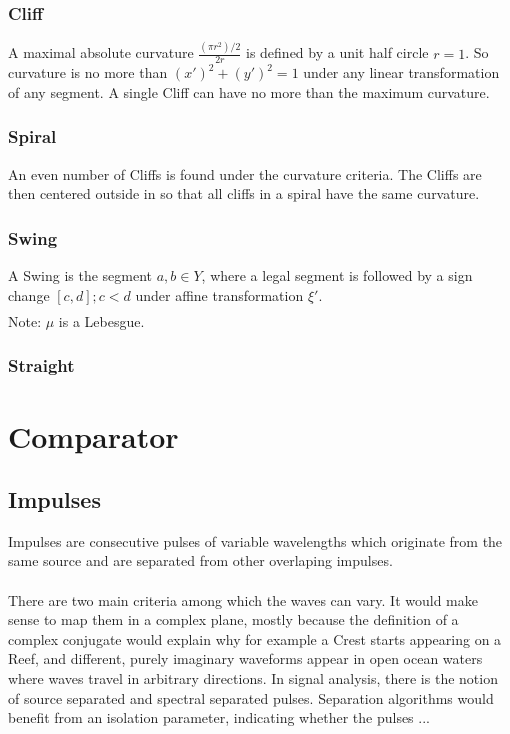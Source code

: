\documentclass{article}
\begin{document}
\subsubsection{Cliff}
A maximal absolute curvature $\frac{(\pi r^2) /2}{2r}$ is defined by a unit half circle $r=1$. So curvature is no more than $(x')^2 + (y')^2 =1$  under any linear transformation of any segment.
A single Cliff can have no more than the maximum curvature.

\subsubsection{Spiral}
An even number of Cliffs is found under the curvature criteria.
The Cliffs are then centered outside in so that all cliffs in a spiral have the same curvature.

\subsubsection{Swing}
A Swing is the segment $a,b \in Y$, where a legal segment is followed by a sign change $[c,d]; c<d$ under affine transformation $\xi'$.
\begin{align}
\end{align}
Note: $\mu$ is a Lebesgue.

\subsubsection{Straight}

\section{Comparator}
\subsection{Impulses}
Impulses are consecutive pulses of variable wavelengths which originate from the same source and are separated from other overlaping impulses.\\\\
There are two main criteria among which the waves can vary. It would make sense to map them in a complex plane, mostly because the definition of a complex conjugate would explain why for example a Crest starts appearing on a Reef, and different, purely imaginary waveforms appear in open ocean waters where waves travel in arbitrary directions. In signal analysis, there is the notion of source separated and spectral separated pulses. Separation algorithms would benefit from an isolation parameter, indicating whether the pulses ...\\\\
\end{document}
